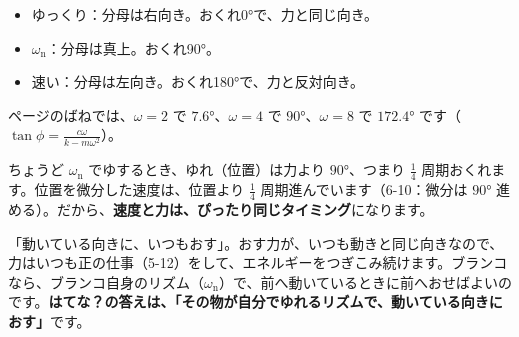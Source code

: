 \par\vspace{4pt}\noindent\begin{minipage}[c]{0.56\linewidth}
\end{minipage}\hfill
\begin{minipage}[c]{0.41\linewidth}
\raggedright
\begin{itemize}[leftmargin=1.2\zw, itemsep=2pt, topsep=0pt, label={\color{\bkTT}●}]
\item ゆっくり：分母は右向き。おくれ0°で、力と同じ向き。
\item $\omega_{\mathrm n}$：分母は真上。おくれ90°。
\item 速い：分母は左向き。おくれ180°で、力と反対向き。
\end{itemize}
\end{minipage}\par\vspace{4pt}
\pageref{bk:6-13:hyo}ページのばねでは、$\omega=2$ で $7.6°$、$\omega=4$ で $90°$、$\omega=8$ で $172.4°$ です（$\tan\phi=\frac{c\omega}{k-m\omega^2}$）。

ちょうど $\omega_{\mathrm n}$ でゆするとき、ゆれ（位置）は力より $90°$、つまり $\frac14$ 周期おくれます。位置を微分した速度は、位置より $\frac14$ 周期進んでいます（6-10：微分は $90°$ 進める）。だから、\textbf{速度と力は、ぴったり同じタイミング}になります。

「動いている向きに、いつもおす」。おす力が、いつも動きと同じ向きなので、力はいつも正の仕事（5-12）をして、エネルギーをつぎこみ続けます。ブランコなら、ブランコ自身のリズム（$\omega_{\mathrm n}$）で、前へ動いているときに前へおせばよいのです。\textbf{はてな？の答えは、「その物が自分でゆれるリズムで、動いている向きにおす」}です。

